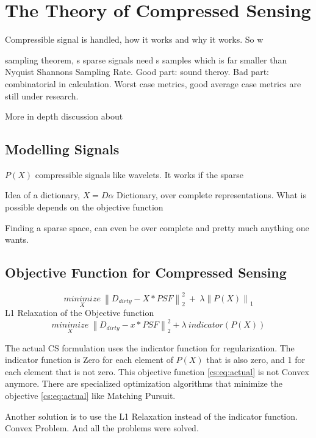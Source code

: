 \section{The Theory of Compressed Sensing} \label{cs}

Compressible signal is handled, how it works and why it works. So w

sampling theorem, s sparse signals need s samples which is far smaller than Nyquist Shannons Sampling Rate. Good part: sound theroy. Bad part: combinatorial in calculation. Worst case metrics, good average case metrics are still under research.

More in depth discussion about


\subsection{Modelling Signals}
$P(X)$ compressible signals like wavelets. It works if the sparse 

Idea of a dictionary, $X = D\alpha$
Dictionary, over complete representations. What is possible depends on the objective function

Finding a sparse space, can even be over complete and pretty much anything one wants.


\subsection{Objective Function for Compressed Sensing}
\begin{equation}\label{intro:eq:csclean}
\underset{X}{minimize} \: \left \| D_{dirty} - X \ast PSF \right \|_2^2 \: + \: \lambda \left \| P(X) \right \|_1
\end{equation}
L1 Relaxation of the Objective function
\begin{equation} \label{cs:eq:actual}
\underset{X}{minimize} \: \left \| D_{dirty} - x \ast PSF \right \|_2^2 + \lambda \: indicator(P(X))
\end{equation}

The actual CS formulation uses the indicator function for regularization. The indicator function is Zero for each element of $P(X)$ that is also zero, and 1 for each element that is not zero. This objective function \eqref{cs:eq:actual} is not Convex anymore. There are specialized optimization algorithms that minimize the objective \eqref{cs:eq:actual} like Matching Pursuit. 

Another solution is to use the L1 Relaxation instead of the indicator function. Convex Problem. And all the problems were solved.


